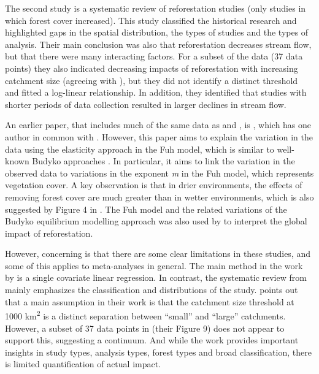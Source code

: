 \documentclass[]{elsarticle} %
\begin{document}
The second study \citep{filoso2017} is a systematic review of reforestation studies (only studies in which forest cover increased). This study classified the historical research and highlighted gaps in the spatial distribution, the types of studies and the types of analysis. Their main conclusion was also that reforestation decreases stream flow, but that there were many interacting factors. For a subset of the data (37 data points) they also indicated decreasing impacts of reforestation with increasing catchment size (agreeing with \citet{zhang2017}), but they did not identify a distinct threshold and fitted a log-linear relationship. In addition, they identified that studies with shorter periods of data collection resulted in larger declines in stream flow.

An earlier paper, that includes much of the same data as \citet{zhang2017} and \citet{filoso2017}, is \citet{zhou2015}, which has one author in common with \citet{zhang2017}. However, this paper aims to explain the variation in the data using the elasticity approach in the Fuh model, which is similar to well-known Budyko approaches \citep{zhang2018elasticity}. In particular, it aims to link the variation in the observed data to variations in the exponent \emph{m} in the Fuh model, which represents vegetation cover. A key observation is that in drier environments, the effects of removing forest cover are much greater than in wetter environments, which is also suggested by Figure 4 in \citet{zhang2017}. The Fuh model and the related variations of the Budyko equilibrium modelling approach was also used by \citet{hoekvandijke2022} to interpret the global impact of reforestation.

However, concerning is that there are some clear limitations in these studies, and some of this applies to meta-analyses in general. The main method in the work by \citet{zhang2017} is a single covariate linear regression. In contrast, the systematic review from \citet{filoso2017} mainly emphasizes the classification and distributions of the study. \citet{zhang2017} points out that a main assumption in their work is that the catchment size threshold at 1000 km\textsuperscript{2} is a distinct separation between ``small'' and ``large'' catchments. However, a subset of 37 data points in \citet{filoso2017} (their Figure 9) does not appear to support this, suggesting a continuum. And while the work \citet{filoso2017} provides important insights in study types, analysis types, forest types and broad classification, there is limited quantification of actual impact.
\end{document}
